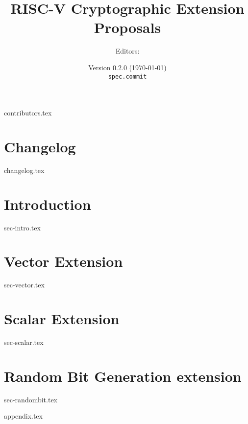 \documentclass[11pt]{article}
\title{RISC-V Cryptographic Extension Proposals}
\author{Editors: }
\date{Version $0.2.0$ (\today) \\
{\small \tt {spec.commit}}
}
\begin{document}

\maketitle

{contributors.tex}

\tableofcontents


\newpage
\section{Changelog}
\label{sec:changelog}
{changelog.tex}


\newpage
\section{Introduction}
\label{sec:intro}
{sec-intro.tex}

\newpage
\section{Vector Extension}
\label{sec:vector}
{sec-vector.tex}

\newpage
\section{Scalar Extension}
\label{sec:scalar}
{sec-scalar.tex}

\newpage
\section{Random Bit Generation extension}
\label{sec:randombit}
{sec-randombit.tex}


\newpage
\printbibliography


%
%

\newpage
\appendix
\label{sec:appendix}
{appendix.tex}

\end{document}
